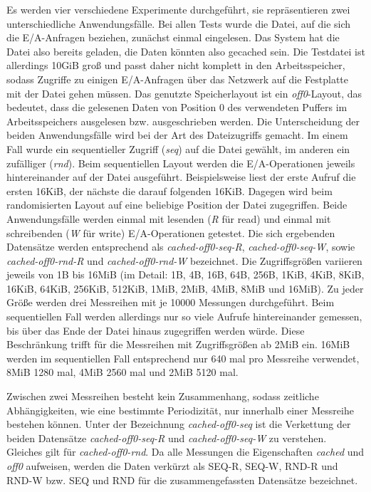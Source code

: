 \documentclass[
	12pt,
	a4paper,
	BCOR10mm,
	DIV14,
	listof=totoc,
	bibliography=totoc,
	headsepline
]{scrreprt}
\begin{document}
Es werden vier verschiedene Experimente durchgeführt, sie repräsentieren zwei unterschiedliche Anwendungsfälle.
Bei allen Tests wurde die Datei, auf die sich die E/A-Anfragen beziehen, zunächst einmal eingelesen. Das System hat die Datei also bereits geladen, die Daten könnten also gecached sein.
Die Testdatei ist allerdings 10GiB groß und passt daher nicht komplett in den Arbeitsspeicher, sodass Zugriffe zu einigen E/A-Anfragen über das Netzwerk auf die Festplatte mit der Datei gehen müssen.
Das genutzte Speicherlayout ist ein \textit{off0}-Layout, das bedeutet, dass die gelesenen Daten von Position 0 des verwendeten Puffers im Arbeitsspeichers ausgelesen bzw. ausgeschrieben werden.
Die Unterscheidung der beiden Anwendungsfälle wird bei der Art des Dateizugriffs gemacht.
Im einem Fall wurde ein sequentieller Zugriff (\textit{seq}) auf die Datei gewählt, im anderen ein zufälliger (\textit{rnd}).
Beim sequentiellen Layout werden die E/A-Operationen jeweils hintereinander auf der Datei ausgeführt. Beispielsweise liest der erste Aufruf die ersten 16KiB, der nächste die darauf folgenden 16KiB.
Dagegen wird beim randomisierten Layout auf eine beliebige Position der Datei zugegriffen.
Beide Anwendungsfälle werden einmal mit lesenden (\textit{R} für read) und einmal mit schreibenden (\textit{W} für write) E/A-Operationen getestet.
Die sich ergebenden Datensätze werden entsprechend als \textit{cached-off0-seq-R}, \textit{cached-off0-seq-W}, sowie \textit{cached-off0-rnd-R} und \textit{cached-off0-rnd-W} bezeichnet.
Die Zugriffsgrößen variieren jeweils von 1B bis 16MiB (im Detail: 1B, 4B, 16B, 64B, 256B, 1KiB, 4KiB, 8KiB, 16KiB, 64KiB, 256KiB, 512KiB, 1MiB, 2MiB, 4MiB, 8MiB und 16MiB).
Zu jeder Größe werden drei Messreihen mit je 10000 Messungen durchgeführt.
Beim sequentiellen Fall werden allerdings nur so viele Aufrufe hintereinander gemessen, bis über das Ende der Datei hinaus zugegriffen werden würde.
Diese Beschränkung trifft für die Messreihen mit Zugriffsgrößen ab 2MiB ein. 16MiB werden im sequentiellen Fall entsprechend nur 640 mal pro Messreihe verwendet, 8MiB 1280 mal, 4MiB 2560 mal und 2MiB 5120 mal.\medskip

Zwischen zwei Messreihen besteht kein Zusammenhang, sodass zeitliche Abhängigkeiten, wie eine bestimmte Periodizität, nur innerhalb einer Messreihe bestehen können.  
Unter der Bezeichnung \textit{cached-off0-seq} ist die Verkettung der beiden Datensätze \textit{cached-off0-seq-R} und \textit{cached-off0-seq-W} zu verstehen. Gleiches gilt für \textit{cached-off0-rnd}.
Da alle Messungen die Eigenschaften \textit{cached} und \textit{off0} aufweisen, werden die Daten verkürzt als SEQ-R, SEQ-W, RND-R und RND-W bzw. SEQ und RND für die zusammengefassten Datensätze bezeichnet. 
\end{document}
